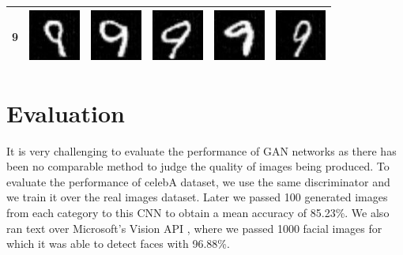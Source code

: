 \begin{table}[H]
\begin{tabular}{|llllll|}
9 & \includegraphics[width=1.69cm, height=1.69cm]{Files/MNIST/1-1.png}  &\includegraphics[width=1.69cm, height=1.69cm]{Files/MNIST/2-3.png}   & \includegraphics[width=1.69cm, height=1.69cm]{Files/MNIST/4-7.png}  & \includegraphics[width=1.69cm, height=1.69cm]{Files/MNIST/6-1.png}  & \includegraphics[width=1.69cm, height=1.69cm]{Files/MNIST/7-3.png} \\ \hline

\end{tabular}
\end{table}



\section{Evaluation}

It is very challenging to evaluate the performance of GAN networks as there has been no comparable method to judge the quality of images being produced.  To evaluate the performance of celebA \cite{celeba} dataset, we use the same discriminator and we train it over the real images dataset. Later we passed 100 generated images from each category to this CNN to obtain a mean accuracy of 85.23\%. We also ran text over Microsoft's Vision API \cite{Microsoft}, where we passed 1000 facial images for which it was able to detect faces with 96.88\%. 